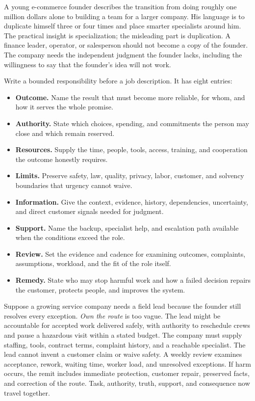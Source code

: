 A young e-commerce founder describes the transition from doing roughly one
million dollars alone to building a team for a larger company. His language is
to duplicate himself three or four times and place smarter specialists around
him. The practical insight is specialization; the misleading part is
duplication. A finance leader, operator, or salesperson should not become a
copy of the founder. The company needs the independent judgment the founder
lacks, including the willingness to say that the founder's idea will not work.

Write a bounded responsibility before a job description. It has eight entries:

\begin{itemize}[leftmargin=0pt,label={},labelsep=0pt,itemsep=0.16em,
  parsep=0pt,topsep=0.35em]
\item \textbf{Outcome.} Name the result that must become more reliable, for
  whom, and how it serves the whole promise.
\item \textbf{Authority.} State which choices, spending, and commitments the
  person may close and which remain reserved.
\item \textbf{Resources.} Supply the time, people, tools, access, training,
  and cooperation the outcome honestly requires.
\item \textbf{Limits.} Preserve safety, law, quality, privacy, labor,
  customer, and solvency boundaries that urgency cannot waive.
\item \textbf{Information.} Give the context, evidence, history,
  dependencies, uncertainty, and direct customer signals needed for judgment.
\item \textbf{Support.} Name the backup, specialist help, and escalation path
  available when the conditions exceed the role.
\item \textbf{Review.} Set the evidence and cadence for examining outcomes,
  complaints, assumptions, workload, and the fit of the role itself.
\item \textbf{Remedy.} State who may stop harmful work and how a failed
  decision repairs the customer, protects people, and improves the system.
\end{itemize}

Suppose a growing service company needs a field lead because the founder still
resolves every exception. \emph{Own the route} is too vague. The lead might be
accountable for accepted work delivered safely, with authority to reschedule
crews and pause a hazardous visit within a stated budget. The company must
supply staffing, tools, contract terms, complaint history, and a reachable
specialist. The lead cannot invent a customer claim or waive safety. A weekly
review examines acceptance, rework, waiting time, worker load, and unresolved
exceptions. If harm occurs, the remit includes immediate protection, customer
repair, preserved facts, and correction of the route. Task, authority, truth,
support, and consequence now travel together.

